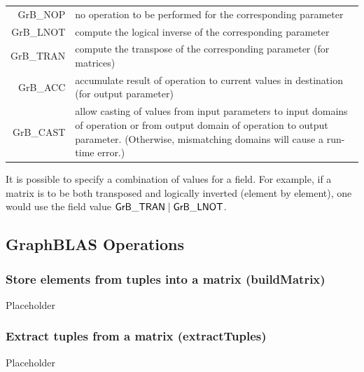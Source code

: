 \documentclass[11pt]{extarticle}
\begin{document}
\begin{tabular}{rl} 
{\sf GrB\_NOP} 	& no operation to be performed for the corresponding parameter \\
{\sf GrB\_LNOT}	& \parbox[t]{5in}{compute the logical inverse  of the corresponding parameter}  \\
{\sf GrB\_TRAN}	& compute the transpose of the corresponding parameter (for matrices) \\
{\sf GrB\_ACC}  & accumulate result of operation to current values in destination (for output parameter) \\
{\sf GrB\_CAST} & \parbox[t]{5in}{allow casting of values from input parameters to input domains of operation
                  or from output domain of operation to output parameter. (Otherwise, mismatching domains will cause a run-time error.)}
\end{tabular}



It is possible to specify a combination of values for a field. For 
example, if a matrix is to be both transposed and logically inverted
(element by element), one would use the field value
${\sf GrB\_TRAN} \mid {\sf GrB\_LNOT}$. 



\subsection{GraphBLAS Operations}

\subsubsection{Store elements from tuples into a matrix ({\sf buildMatrix})}

Placeholder

\subsubsection{Extract tuples from a matrix ({\sf extractTuples})}

Placeholder
\end{document}

